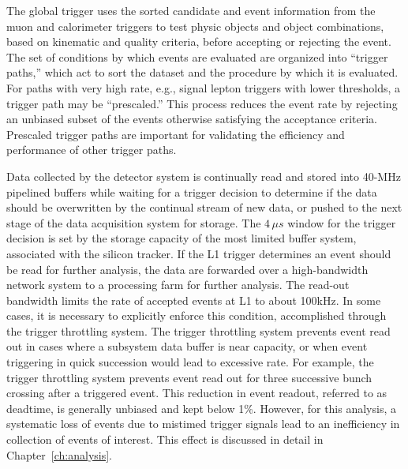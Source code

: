The global trigger uses the sorted candidate and event information from
the muon and calorimeter triggers to test 
physic objects and object combinations, 
based on kinematic and quality criteria, before accepting or rejecting
the event. The set of conditions by which events are evaluated
are organized into ``trigger paths,'' which act to sort the 
dataset and the procedure by which it is evaluated. For paths 
with very high rate, e.g., signal lepton triggers with lower \pt
thresholds, a trigger path may be ``prescaled.'' This process 
reduces the event rate by rejecting an unbiased subset of the events
otherwise satisfying the acceptance criteria. Prescaled trigger paths
are important for validating the efficiency and performance of other
trigger paths.

Data collected by the detector system is continually read and stored into
40-MHz pipelined buffers while waiting for a trigger decision to determine
if the data should be overwritten by the continual stream of new data,
or pushed to the next stage of the data acquisition system for storage.
The $4\,\mu s$ window for the trigger decision is set by the storage capacity
of the most limited buffer system, associated with the silicon tracker.
If the L1 trigger determines an event should be read for further analysis,
the data are forwarded over a high-bandwidth network system to a 
processing farm for further analysis. The read-out bandwidth limits the 
rate of accepted events at L1 to about 100\unit{kHz}. In some cases, it is
necessary to explicitly enforce this condition, accomplished through
the trigger throttling system. The trigger throttling system prevents event
read out in cases where a subsystem data buffer is near capacity,
or when event triggering in quick succession would lead to excessive rate. For example,
the trigger throttling system prevents event read out for three successive
bunch crossing after a triggered event. This reduction in event readout,
referred to as deadtime, is generally unbiased and kept below 1\%. However,
for this analysis, a systematic loss of events due to mistimed
trigger signals lead to an inefficiency in collection of events of interest. This
effect is discussed in detail in Chapter~\ref{ch:analysis}.


